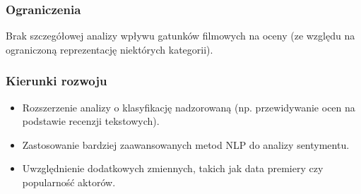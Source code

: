 \documentclass[a4paper,12pt,titlepage]{article}
\begin{document}
\subsubsection{Ograniczenia}
Brak szczegółowej analizy wpływu gatunków filmowych na oceny (ze względu na ograniczoną reprezentację niektórych kategorii).
\subsubsection{Kierunki rozwoju}

\begin{itemize}
    \item Rozszerzenie analizy o klasyfikację nadzorowaną (np. przewidywanie ocen na podstawie recenzji tekstowych).
    \item Zastosowanie bardziej zaawansowanych metod NLP do analizy sentymentu.
    \item Uwzględnienie dodatkowych zmiennych, takich jak data premiery czy popularność aktorów.
\end{itemize}

\clearpage
\end{document}
